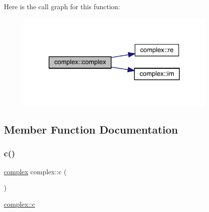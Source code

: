 Here is the call graph for this function\+:\nopagebreak
\begin{figure}[H]
\begin{center}
\leavevmode
\includegraphics[width=281pt]{classcomplex_a57fa59491a94c3aeeb5b005fed5d0ed4_cgraph}
\end{center}
\end{figure}


\subsection{Member Function Documentation}
\mbox{\label{classcomplex_a4741546b5617d11e87ee7831067c84c5}} 
\subsubsection{\texorpdfstring{c()}{c()}}
{\footnotesize\ttfamily \mbox{\hyperlink{classcomplex}{complex}} complex\+::c (\begin{DoxyParamCaption}{ }\end{DoxyParamCaption})}



\mbox{\hyperlink{classcomplex_a4741546b5617d11e87ee7831067c84c5}{complex\+::c}} 

